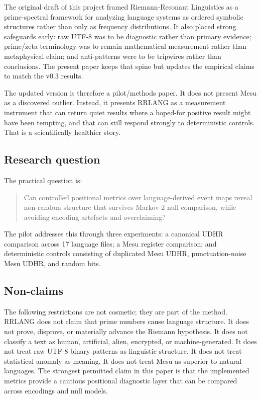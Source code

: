 \documentclass[11pt,a4paper]{article}
\newcommand{\RRLANG}{\textsc{RRLANG}}
\begin{document}
The original draft of this project framed Riemann-Resonant Linguistics as a prime-spectral framework for analyzing language systems as ordered symbolic structures rather than only as frequency distributions. It also placed strong safeguards early: raw UTF-8 was to be diagnostic rather than primary evidence; prime/zeta terminology was to remain mathematical measurement rather than metaphysical claim; and anti-patterns were to be tripwires rather than conclusions. The present paper keeps that spine but updates the empirical claims to match the v0.3 results.

The updated version is therefore a pilot/methods paper. It does not present Mesu as a discovered outlier. Instead, it presents \RRLANG{} as a measurement instrument that can return quiet results where a hoped-for positive result might have been tempting, and that can still respond strongly to deterministic controls. That is a scientifically healthier story.

\subsection{Research question}
The practical question is:
\begin{quote}
Can controlled positional metrics over language-derived event maps reveal non-random structure that survives Markov-2 null comparison, while avoiding encoding artefacts and overclaiming?
\end{quote}

The pilot addresses this through three experiments: a canonical UDHR comparison across 17 language files; a Mesu register comparison; and deterministic controls consisting of duplicated Mesu UDHR, punctuation-noise Mesu UDHR, and random bits.

\subsection{Non-claims}
The following restrictions are not cosmetic; they are part of the method. \RRLANG{} does not claim that prime numbers cause language structure. It does not prove, disprove, or materially advance the Riemann hypothesis. It does not classify a text as human, artificial, alien, encrypted, or machine-generated. It does not treat raw UTF-8 binary patterns as linguistic structure. It does not treat statistical anomaly as meaning. It does not treat Mesu as superior to natural languages. The strongest permitted claim in this paper is that the implemented metrics provide a cautious positional diagnostic layer that can be compared across encodings and null models.
\end{document}
